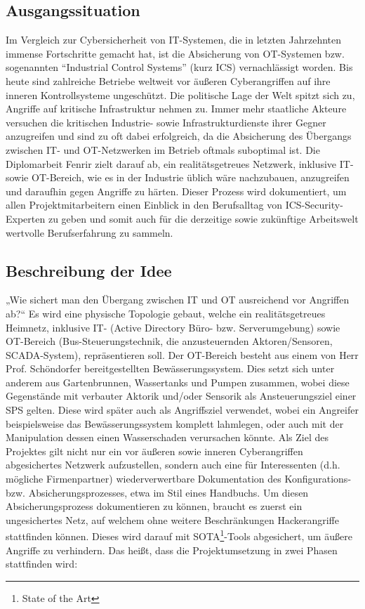 \documentclass[
	headings=optiontotocandhead,%
	oneside,
	numbers=noenddot,%
	toc=flat, %
	10pt, %
	parskip=full, %
	listof=totoc, %
	listof=flat, %
	numbers=noenddot, %
	bibliography=totoc, %
	a4paper,DIV=14,
]{scrartcl}
\begin{document}
\subsection{Ausgangssituation}
Im Vergleich zur Cybersicherheit von IT-Systemen, die in letzten Jahrzehnten immense Fortschritte gemacht hat, ist die Absicherung von OT-Systemen bzw. sogenannten “Industrial Control Systems” (kurz ICS) vernachlässigt worden. Bis heute sind zahlreiche Betriebe weltweit vor äußeren Cyberangriffen auf ihre inneren Kontrollsysteme ungeschützt.
Die politische Lage der Welt spitzt sich zu, Angriffe auf kritische Infrastruktur nehmen zu. Immer mehr staatliche Akteure versuchen die kritischen Industrie- sowie Infrastrukturdienste ihrer Gegner anzugreifen und sind zu oft dabei erfolgreich, da die Absicherung des Übergangs zwischen IT- und OT-Netzwerken im Betrieb oftmals suboptimal ist. 
Die Diplomarbeit Fenrir zielt darauf ab, ein realitätsgetreues Netzwerk, inklusive IT- sowie OT-Bereich, wie es in der Industrie üblich wäre nachzubauen, anzugreifen und daraufhin gegen Angriffe zu härten. Dieser Prozess wird dokumentiert, um allen Projektmitarbeitern einen Einblick in den Berufsalltag von ICS-Security-Experten zu geben und somit auch für die derzeitige sowie zukünftige Arbeitswelt wertvolle Berufserfahrung zu sammeln.

\subsection{Beschreibung der Idee}
„Wie sichert man den Übergang zwischen IT und OT ausreichend vor Angriffen ab?“
Es wird eine physische Topologie gebaut, welche ein realitätsgetreues Heimnetz, inklusive IT- (Active Directory Büro- bzw. Serverumgebung) sowie OT-Bereich (Bus-Steuerungstechnik, die anzusteuernden Aktoren/Sensoren, SCADA-System), repräsentieren soll.
Der OT-Bereich besteht aus einem von Herr Prof. Schöndorfer bereitgestellten Bewässerungssystem. Dies setzt sich unter anderem aus Gartenbrunnen, Wassertanks und Pumpen zusammen, wobei diese Gegenstände mit verbauter Aktorik und/oder Sensorik als Ansteuerungsziel einer SPS gelten. Diese wird später auch als Angriffsziel verwendet, wobei ein Angreifer beispielsweise das Bewässerungssystem komplett lahmlegen, oder auch mit der Manipulation dessen einen Wasserschaden verursachen könnte.
Als Ziel des Projektes gilt nicht nur ein vor äußeren sowie inneren Cyberangriffen abgesichertes Netzwerk aufzustellen, sondern auch eine für Interessenten (d.h. mögliche Firmenpartner) wiederverwertbare Dokumentation des Konfigurations- bzw. Absicherungsprozesses, etwa im Stil eines Handbuchs.
Um diesen Absicherungsprozess dokumentieren zu können, braucht es zuerst ein ungesichertes Netz, auf welchem ohne weitere Beschränkungen Hackerangriffe stattfinden können. Dieses wird darauf mit SOTA\footnote{State of the Art}-Tools abgesichert, um äußere Angriffe zu verhindern. Das heißt, dass die Projektumsetzung in zwei Phasen stattfinden wird: \\
\end{document}
